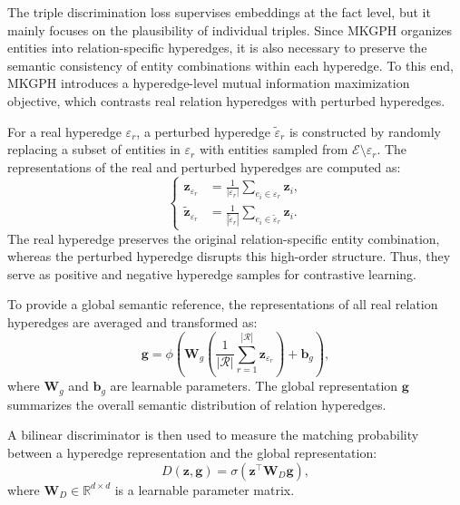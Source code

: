 \documentclass[a4paper,fleqn]{cas-sc}
\begin{document}
The triple discrimination loss supervises embeddings at the fact level, but it mainly focuses on the plausibility of individual triples. Since MKGPH organizes entities into relation-specific hyperedges, it is also necessary to preserve the semantic consistency of entity combinations within each hyperedge. To this end, MKGPH introduces a hyperedge-level mutual information maximization objective, which contrasts real relation hyperedges with perturbed hyperedges.

For a real hyperedge $\varepsilon_r$, a perturbed hyperedge $\widetilde{\varepsilon}_r$ is constructed by randomly replacing a subset of entities in $\varepsilon_r$ with entities sampled from $\mathcal{E}\setminus\varepsilon_r$. The representations of the real and perturbed hyperedges are computed as:
\begin{equation}
\left\{
\begin{aligned}
\mathbf{z}_{\varepsilon_r}
&=
\frac{1}{|\varepsilon_r|}
\sum_{e_i\in\varepsilon_r}
\mathbf{z}_i, \\
\widetilde{\mathbf{z}}_{\varepsilon_r}
&=
\frac{1}{|\widetilde{\varepsilon}_r|}
\sum_{e_i\in\widetilde{\varepsilon}_r}
\mathbf{z}_i.
\end{aligned}
\right.
\end{equation}
The real hyperedge preserves the original relation-specific entity combination, whereas the perturbed hyperedge disrupts this high-order structure. Thus, they serve as positive and negative hyperedge samples for contrastive learning.

To provide a global semantic reference, the representations of all real relation hyperedges are averaged and transformed as:
\begin{equation}
\mathbf{g}
=
\phi
\left(
\mathbf{W}_{g}
\left(
\frac{1}{|\mathcal{R}|}
\sum_{r=1}^{|\mathcal{R}|}
\mathbf{z}_{\varepsilon_r}
\right)
+
\mathbf{b}_{g}
\right),
\end{equation}
where $\mathbf{W}_{g}$ and $\mathbf{b}_{g}$ are learnable parameters. The global representation $\mathbf{g}$ summarizes the overall semantic distribution of relation hyperedges.

A bilinear discriminator is then used to measure the matching probability between a hyperedge representation and the global representation:
\begin{equation}
D(\mathbf{z},\mathbf{g})
=
\sigma
\left(
\mathbf{z}^{\top}
\mathbf{W}_{D}
\mathbf{g}
\right),
\end{equation}
where $\mathbf{W}_{D}\in\mathbb{R}^{d\times d}$ is a learnable parameter matrix.
\end{document}
